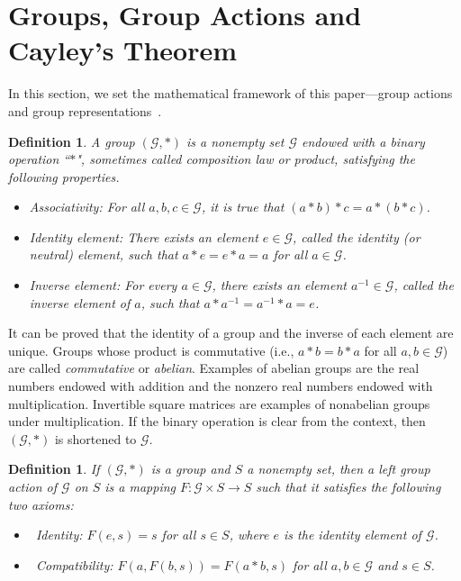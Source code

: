 \documentclass{article}
\newtheorem{definition}[theorem]{Definition}
\begin{document}

\section{Groups, Group Actions and Cayley's Theorem}

\label{sec:Cayley}

In this section, we set the mathematical framework of this paper---group actions and group representations~\cite{Herstein1996,Lang2005,Fraleigh2013}.

\begin{definition}
\label{DefGroup} A group $(\mathcal{G},\ast )$ is a nonempty set $\mathcal{G}$
endowed with a binary operation ``$\ast $", sometimes called composition law or product, satisfying the following properties.

\begin{itemize}
\item[\textbf{\emph{(G1)}}] \emph{Associativity:} For all $a,b,c\in \mathcal{G}$, it is true
that $(a\ast b)\ast c=a\ast (b\ast c)$.

\item[\textbf{\emph{(G2)}}] \emph{Identity element:} There exists an element $e\in \mathcal{G%
}$, called the \textit{identity} (or \textit{neutral}) \textit{element},
such that $a\ast e=e\ast a=a$ for all $a\in \mathcal{G}$.

\item[\textbf{\emph{(G3)}}] \emph{Inverse element:} For every $a\in \mathcal{G}$, there
exists an element $a^{-1}\in \mathcal{G}$, called the \textit{inverse element%
} of $a$, such that $a\ast a^{-1}=a^{-1}\ast a=e$.
\end{itemize}
\end{definition}

It can be proved that the identity of a group and the inverse of each
element are unique. Groups whose product is commutative (i.e., $a\ast
b=b\ast a$ for all $a,b\in \mathcal{G}$) are called \textit{commutative} or 
\textit{abelian}. Examples of abelian groups are the real numbers endowed
with addition and the nonzero real numbers endowed with multiplication.
Invertible square matrices are examples of nonabelian groups under
multiplication. If the binary operation is clear from the context, then $(%
\mathcal{G},\ast )$ is shortened to $\mathcal{G}$.

\begin{definition}
\label{DefinitionAction}If $(\mathcal{G},\ast )$ is a group and $S$ a
nonempty set, then a left group action of $\mathcal{G}$ on $S$ is a mapping $%
F:\mathcal{G}\times S\rightarrow S$ such that it satisfies the following two
axioms:

\begin{itemize}
\item[\textbf{\emph{(L1a)}}]~\emph{Identity:} $F(e,s)=s$ for all $s\in S$, where $e$ is the
identity element of $\mathcal{G}$.

\item[\textbf{\emph{(L2a)}}]~\emph{Compatibility:} $F(a,F(b,s))=F(a\ast b,s)$ for all $a,b\in 
\mathcal{G}$ and $s\in S$.
\end{itemize}
\end{definition}
\end{document}
